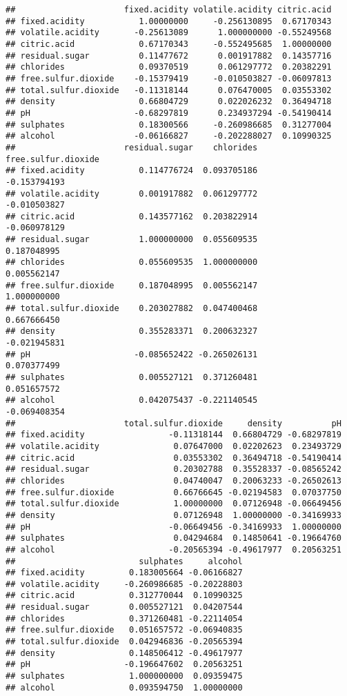 \documentclass[]{article}
\begin{document}
\begin{verbatim}
##                      fixed.acidity volatile.acidity citric.acid
## fixed.acidity           1.00000000     -0.256130895  0.67170343
## volatile.acidity       -0.25613089      1.000000000 -0.55249568
## citric.acid             0.67170343     -0.552495685  1.00000000
## residual.sugar          0.11477672      0.001917882  0.14357716
## chlorides               0.09370519      0.061297772  0.20382291
## free.sulfur.dioxide    -0.15379419     -0.010503827 -0.06097813
## total.sulfur.dioxide   -0.11318144      0.076470005  0.03553302
## density                 0.66804729      0.022026232  0.36494718
## pH                     -0.68297819      0.234937294 -0.54190414
## sulphates               0.18300566     -0.260986685  0.31277004
## alcohol                -0.06166827     -0.202288027  0.10990325
##                      residual.sugar    chlorides free.sulfur.dioxide
## fixed.acidity           0.114776724  0.093705186        -0.153794193
## volatile.acidity        0.001917882  0.061297772        -0.010503827
## citric.acid             0.143577162  0.203822914        -0.060978129
## residual.sugar          1.000000000  0.055609535         0.187048995
## chlorides               0.055609535  1.000000000         0.005562147
## free.sulfur.dioxide     0.187048995  0.005562147         1.000000000
## total.sulfur.dioxide    0.203027882  0.047400468         0.667666450
## density                 0.355283371  0.200632327        -0.021945831
## pH                     -0.085652422 -0.265026131         0.070377499
## sulphates               0.005527121  0.371260481         0.051657572
## alcohol                 0.042075437 -0.221140545        -0.069408354
##                      total.sulfur.dioxide     density          pH
## fixed.acidity                 -0.11318144  0.66804729 -0.68297819
## volatile.acidity               0.07647000  0.02202623  0.23493729
## citric.acid                    0.03553302  0.36494718 -0.54190414
## residual.sugar                 0.20302788  0.35528337 -0.08565242
## chlorides                      0.04740047  0.20063233 -0.26502613
## free.sulfur.dioxide            0.66766645 -0.02194583  0.07037750
## total.sulfur.dioxide           1.00000000  0.07126948 -0.06649456
## density                        0.07126948  1.00000000 -0.34169933
## pH                            -0.06649456 -0.34169933  1.00000000
## sulphates                      0.04294684  0.14850641 -0.19664760
## alcohol                       -0.20565394 -0.49617977  0.20563251
##                         sulphates     alcohol
## fixed.acidity         0.183005664 -0.06166827
## volatile.acidity     -0.260986685 -0.20228803
## citric.acid           0.312770044  0.10990325
## residual.sugar        0.005527121  0.04207544
## chlorides             0.371260481 -0.22114054
## free.sulfur.dioxide   0.051657572 -0.06940835
## total.sulfur.dioxide  0.042946836 -0.20565394
## density               0.148506412 -0.49617977
## pH                   -0.196647602  0.20563251
## sulphates             1.000000000  0.09359475
## alcohol               0.093594750  1.00000000
\end{verbatim}
\end{document}
